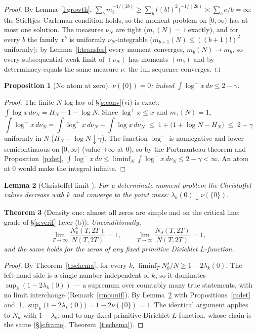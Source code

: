 \documentclass[11pt]{article}
\numberwithin{equation}{section}
\newtheorem{theorem}{Theorem}[section]
\newtheorem{lemma}[theorem]{Lemma}
\newtheorem{proposition}[theorem]{Proposition}
\theoremstyle{definition}
\theoremstyle{remark}
\begin{document}
\begin{proof}
By Lemma~\ref{l:growth},
$\sum_b m_b^{-1/(2b)}\ge\sum_b\bigl((b!)^2\bigr)^{-1/(2b)}
\asymp\sum_b e/b=\infty$: the Stieltjes--Carleman condition
holds, so the moment problem on $[0,\infty)$ has at most one
solution. The measures $\nu_N$ are tight ($m_1(N)=1$
exactly), and for every $b$ the family $x^b$ is uniformly
$\nu_N$-integrable ($m_{b+1}(N)\le((b{+}1)!)^2$ uniformly);
by Lemma~\ref{l:transfer} every moment converges,
$m_b(N)\to m_b$, so every subsequential weak limit of
$(\nu_N)$ has moments $(m_b)$ and by determinacy equals the
same measure $\nu$: the full sequence converges.
\end{proof}

\begin{proposition}[No atom at zero]\label{p:noatom}
$\nu(\{0\})=0$; indeed $\int\log^{-}x\,d\nu\le2-\gamma$.
\end{proposition}

\begin{proof}
The finite-$N$ log law of \S\ref{s:conv}(vi) is exact:
$\int\log x\,d\nu_N=H_N-1-\log N$. Since
$\log^{+}x\le x$ and $m_1(N)=1$,
\[
\int\log^{-}x\,d\nu_N
=\int\log^{+}x\,d\nu_N-\int\log x\,d\nu_N
\;\le\;1+\bigl(1+\log N-H_N\bigr)\;\le\;2-\gamma
\]
uniformly in $N$ ($H_N-\log N\downarrow\gamma$). The function
$\log^{-}$ is nonnegative and lower semicontinuous on
$[0,\infty)$ (value $+\infty$ at $0$), so by the Portmanteau
theorem and Proposition~\ref{p:det},
$\int\log^{-}x\,d\nu\le\liminf_N\int\log^{-}x\,d\nu_N
\le2-\gamma<\infty$. An atom at $0$ would make the integral
infinite.
\end{proof}

\begin{lemma}[Christoffel limit \cite{Akh,Sim98}]\label{l:chr}
For a determinate moment problem the Christoffel values
decrease with $k$ and converge to the point mass:
$\lambda_k(0)\downarrow\nu(\{0\})$.
\end{lemma}

\begin{theorem}[Density one: almost all zeros are simple and
on the critical line; grade of \S\ref{s:verif} layer
(b)]\label{t:dens1}
Unconditionally,
\[
\lim_{T\to\infty}\frac{N_0^{s}(T,2T)}{N(T,2T)}=1,
\qquad
\lim_{T\to\infty}\frac{N_d(T,2T)}{N(T,2T)}=1,
\]
and the same holds for the zeros of any fixed primitive
Dirichlet $L$-function.
\end{theorem}

\begin{proof}
By Theorem~\ref{t:schema}, for every $k$,
$\liminf_T N_0^{s}/N\ge1-2\lambda_k(0)$. The left-hand side
is a single number independent of $k$, so it dominates
$\sup_k(1-2\lambda_k(0))$ --- a supremum over countably many
true statements, with no limit interchange
(Remark~\ref{r:nounif}). By Lemma~\ref{l:chr} with
Propositions~\ref{p:det} and~\ref{p:noatom},
$\sup_k\bigl(1-2\lambda_k(0)\bigr)=1-2\nu(\{0\})=1$. The
identical argument applies to $N_d$ with $1-\lambda_k$, and
to any fixed primitive Dirichlet $L$-function, whose chain
is the same (\S\ref{s:frame}, Theorem~\ref{t:schema}).
\end{proof}
\end{document}
